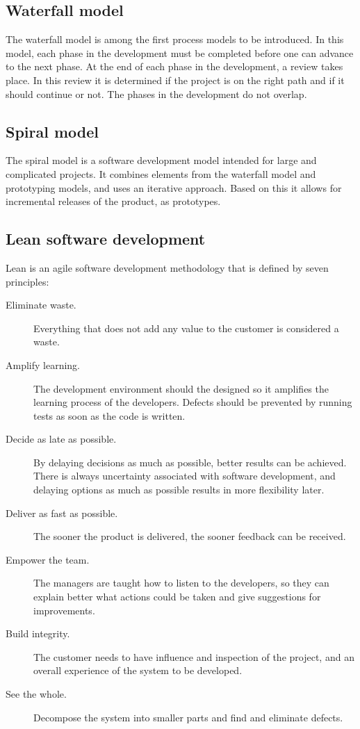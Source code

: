 \subsection{Waterfall model}
The waterfall model is among the first process models to be introduced. In this model, each phase in the development must be completed before one can advance to the next phase. At the end of each phase in the development, a review takes place. In this review it is determined if the project is on the right path and if it should continue or not. The phases in the development do not overlap. \cite{sommerville}

\subsection{Spiral model}
The spiral model is a software development model intended for large and complicated projects. It combines elements from the waterfall model and prototyping models, and uses an iterative approach. Based on this it allows for incremental releases of the product, as prototypes. \cite{sommerville}

\subsection{Lean software development}
Lean is an agile software development methodology that is defined by seven principles\cite{poppendieck}:
\begin{description}
	\item[Eliminate waste.]{Everything that does not add any value to the customer is considered a waste.}
	\item[Amplify learning.]{The development environment should the designed so it amplifies the learning process of the developers. Defects should be prevented by running tests as soon as the code is written.}
	\item[Decide as late as possible.]{By delaying decisions as much as possible, better results can be achieved. There is always uncertainty associated with software development, and delaying options as much as possible results in more flexibility later.}
	\item[Deliver as fast as possible.]{The sooner the product is delivered, the sooner feedback can be received.}
	\item[Empower the team.]{The managers are taught how to listen to the developers, so they can explain better what actions could be taken and give suggestions for improvements.}
	\item[Build integrity.]{The customer needs to have influence and inspection of the project, and an overall experience of the system to be developed.}
	\item[See the whole.]{Decompose the system into smaller parts and find and eliminate defects.}
\end{description}

